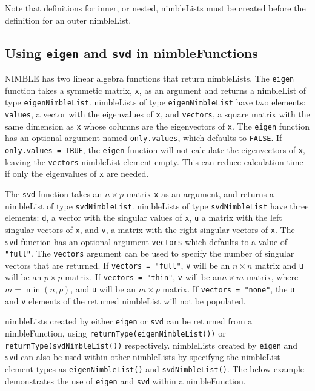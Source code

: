 \documentclass[12pt,oneside]{book}\usepackage[]{graphicx}\usepackage[]{color}
\def\cd#1{\texttt{#1}}
\begin{document}
Note that definitions for inner, or nested, nimbleLists must be created before the definition for an outer nimbleList.


\subsection{Using \cd{eigen} and \cd{svd} in nimbleFunctions}
\label{sec:eigen-nimFunctions}

NIMBLE has two linear algebra functions that return nimbleLists.  The \cd{eigen} function takes a symmetic matrix, \cd{x}, as an argument and returns a nimbleList of type \cd{eigenNimbleList}. nimbleLists of type \cd{eigenNimbleList} have two elements: \cd{values}, a vector with the eigenvalues of \cd{x}, and \cd{vectors}, a square matrix with the same dimension as \cd{x} whose columns are the eigenvectors of \cd{x}.  The \cd{eigen} function has an optional argument named \cd{only.values}, which defaults to \cd{FALSE}.  If \cd{only.values = TRUE}, the \cd{eigen} function will not calculate the eigenvectors of \cd{x}, leaving the \cd{vectors} nimbleList element empty.  This can reduce calculation time if only the eigenvalues of \cd{x} are needed.


The \cd{svd} function takes an $n \times p$ matrix \cd{x} as an argument, and returns a nimbleList of type \cd{svdNimbleList}.   nimbleLists of type  \cd{svdNimbleList} have three elements: \cd{d}, a vector with the singular values of \cd{x}, \cd{u} a matrix with the left singular vectors of \cd{x}, and \cd{v}, a matrix with the right singular vectors of \cd{x}.  The \cd{svd} function has an optional argument \cd{vectors} which defaults to a value of \cd{"full"}.  The \cd{vectors} argument can be used to specify the number of singular vectors that are returned.  If \cd{vectors = "full"}, \cd{v} will be an $n \times n$ matrix and \cd{u} will be an $p \times p$ matrix.  If \cd{vectors = "thin"}, \cd{v} will be an$n \times m$ matrix, where $m = \min(n,p)$, and \cd{u} will be an $m \times p$ matrix.  If \cd{vectors = "none"}, the \cd{u} and \cd{v} elements of the returned nimbleList will not be populated. 
  

nimbleLists created by either \cd{eigen} or \cd{svd} can be returned from a nimbleFunction, using \cd{returnType(eigenNimbleList())} or \cd{returnType(svdNimbleList())} respectively.  nimbleLists created by \cd{eigen} and \cd{svd} can also be used within other nimbleLists by specifyng the nimbleList element types as \cd{eigenNimbleList()} and \cd{svdNimbleList()}.  The below example demonstrates the use of \cd{eigen} and \cd{svd} within a nimbleFunction.
\end{document}
